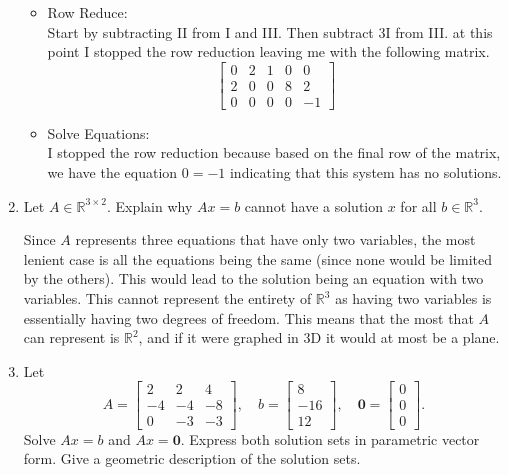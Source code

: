 \documentclass[12pt,a4paper]{exam}
\newcommand{\R}{\mathbb{R}}
\begin{document}
\begin{enumerate}
\begin{solution}
    \begin{itemize}
        \item Row Reduce:\\
            Start by subtracting II from I and III. Then subtract 3I from III. at this point I stopped the row reduction leaving me with the following matrix.
            \[ \left[ \begin{array}{ccccc}
            0 & 2 & 1 & 0 & 0 \\
            2 & 0 & 0 & 8 & 2 \\
            0 & 0 & 0 & 0 & -1
            \end{array} \right] \]
        \item Solve Equations:\\
            I stopped the row reduction because based on the final row of the matrix, we have the equation $0=-1$ indicating that this system has no solutions.
    \end{itemize}
\end{solution}

\item
  Let $A \in\R^{3\times 2}$. %
  Explain why $Ax=b$ cannot
  have a solution $x$ for all $b \in \R^3$.
  \begin{solution}
      Since $A$ represents three equations that have only two variables, the most lenient case is all the equations being the same (since none would be limited by the others). This would lead to the solution being an equation with two variables. This cannot represent the entirety of $\R^3$ as having two variables is essentially having two degrees of freedom. This means that the most that $A$ can represent is $\R^2$, and if it were graphed in 3D it would at most be a plane.
  \end{solution}


\item \cite[cf. Section 1.5, Ex 17]{La-LA}
Let
\[
A=\left[\begin{matrix} 2 & 2 & 4 \\ -4 & -4 & -8 \\ 0 & -3 & -3
\end{matrix}\right], \quad
b=\left[\begin{matrix} 8 \\ -16 \\ 12 \end{matrix}\right], \quad
\mathbf{0}=\left[\begin{matrix} 0 \\ 0 \\ 0 \end{matrix}\right].
\]
Solve $Ax=b$ and  $Ax=\mathbf{0}$. Express both solution sets in parametric vector form.
Give a geometric description of the solution sets.


\end{enumerate}
\end{document}
